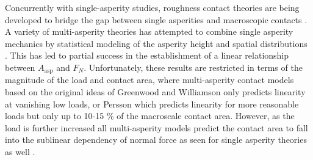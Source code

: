
Concurrently with single-asperity studies, roughness contact theories are being developed \cite{PhysRevLett.100.055504, Persson, GW, BUSH197587} to bridge the gap between single asperities and macroscopic contacts \cite{mo_friction_2009}. A variety of multi-asperity theories has attempted to combine single asperity
mechanics by statistical modeling of the asperity height and spatial
distributions \cite{CARBONE20082555}. This has led to partial success in the establishment of a linear relationship between $A_{\text{asp}}$ and $F_N$. Unfortunately, these results are restricted
in terms of the magnitude of the load and contact area, where multi-asperity
contact models based on the original ideas of Greenwood and Williamson \cite{GW}
only predicts linearity at vanishing low loads, or Persson \cite{Persson} which predicts linearity for more reasonable loads but only up to 10-15 \% of the macroscale contact area. However, as the load is further increased all multi-asperity models
predict the contact area to fall into the sublinear dependency of normal force
as seen for single asperity theories as well \cite{CARBONE20082555}.








